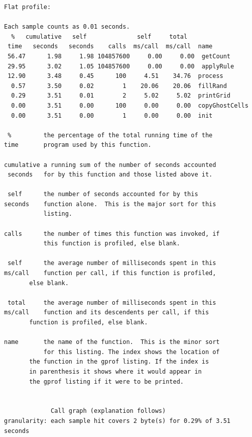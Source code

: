 \documentclass[11pt]{article} %
\begin{document}
\begin{verbatim}
Flat profile:

Each sample counts as 0.01 seconds.
  %   cumulative   self              self     total           
 time   seconds   seconds    calls  ms/call  ms/call  name    
 56.47      1.98     1.98 104857600     0.00     0.00  getCount
 29.95      3.02     1.05 104857600     0.00     0.00  applyRule
 12.90      3.48     0.45      100     4.51    34.76  process
  0.57      3.50     0.02        1    20.06    20.06  fillRand
  0.29      3.51     0.01        2     5.02     5.02  printGrid
  0.00      3.51     0.00      100     0.00     0.00  copyGhostCells
  0.00      3.51     0.00        1     0.00     0.00  init

 %         the percentage of the total running time of the
time       program used by this function.

cumulative a running sum of the number of seconds accounted
 seconds   for by this function and those listed above it.

 self      the number of seconds accounted for by this
seconds    function alone.  This is the major sort for this
           listing.

calls      the number of times this function was invoked, if
           this function is profiled, else blank.
 
 self      the average number of milliseconds spent in this
ms/call    function per call, if this function is profiled,
	   else blank.

 total     the average number of milliseconds spent in this
ms/call    function and its descendents per call, if this 
	   function is profiled, else blank.

name       the name of the function.  This is the minor sort
           for this listing. The index shows the location of
	   the function in the gprof listing. If the index is
	   in parenthesis it shows where it would appear in
	   the gprof listing if it were to be printed.


		     Call graph (explanation follows)
granularity: each sample hit covers 2 byte(s) for 0.29% of 3.51 seconds


\end{verbatim}
\end{document}
